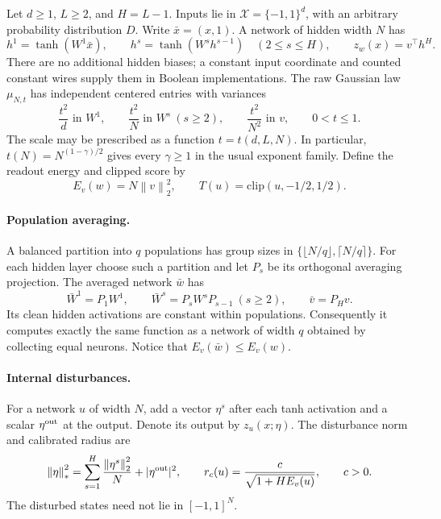 \documentclass[11pt]{article}
\newcommand{\norm}[1]{\left\|#1\right\|}
\newcommand{\clip}{\mathrm{clip}}
\begin{document}
Let $d\ge1$, $L\ge2$, and $H=L-1$. Inputs lie in
$\mathcal X=\{-1,1\}^d$, with an arbitrary probability distribution $D$.
Write $\bar x=(x,1)$. A network of hidden width $N$ has
\[
 h^1=\tanh(W^1\bar x),\qquad
 h^s=\tanh(W^sh^{s-1})\quad(2\le s\le H),\qquad
 z_w(x)=v^\top h^H.
\]
There are no additional hidden biases; a constant input coordinate and
counted constant wires supply them in Boolean implementations.
The raw Gaussian law $\mu_{N,t}$ has independent centered entries with
variances
\begin{equation}\label{eq:prior}
 \frac{t^2}{d}\text{ in }W^1,\qquad
 \frac{t^2}{N}\text{ in }W^s\ (s\ge2),\qquad
 \frac{t^2}{N^2}\text{ in }v,\qquad 0<t\le1.
\end{equation}
The scale may be prescribed as a function $t=t(d,L,N)$.
In particular, $t(N)=N^{(1-\gamma)/2}$ gives every $\gamma\ge1$ in the
usual exponent family. Define the readout energy and clipped score by
\[
 E_v(w)=N\norm v_2^2,\qquad T(u)=\clip(u,-1/2,1/2).
\]

\paragraph{Population averaging.}
A balanced partition into $q$ populations has group sizes in
$\{\lfloor N/q\rfloor,\lceil N/q\rceil\}$. For each hidden layer choose
such a partition and let $P_s$ be its orthogonal averaging projection.
The averaged network $\bar w$ has
\begin{equation}\label{eq:projection}
 \bar W^1=P_1W^1,\qquad
 \bar W^s=P_sW^sP_{s-1}\ (s\ge2),\qquad
 \bar v=P_Hv.
\end{equation}
Its clean hidden activations are constant within populations. Consequently
it computes exactly the same function as a network of width $q$ obtained
by collecting equal neurons. Notice that
$E_v(\bar w)\le E_v(w)$.

\paragraph{Internal disturbances.}
For a network $u$ of width $N$, add a vector $\eta^s$ after each tanh
activation and a scalar $\eta^{\rm out}$ at the output. Denote its output
by $z_u(x;\eta)$. The disturbance norm and calibrated radius are
\begin{equation}\label{eq:noise}
 \norm\eta_*^2=\sum_{s=1}^H\frac{\norm{\eta^s}_2^2}{N}
                    +|\eta^{\rm out}|^2,
 \qquad r_c(u)=\frac{c}{\sqrt{1+H E_v(u)}},\qquad c>0.
\end{equation}
The disturbed states need not lie in $[-1,1]^N$.
\end{document}
